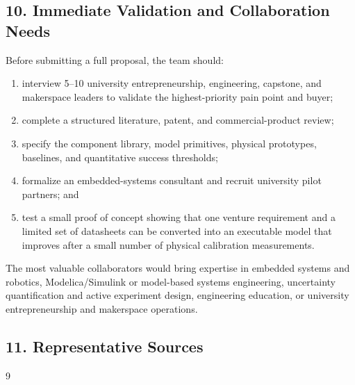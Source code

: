 \documentclass[12pt,letterpaper]{article}
\begin{document}
\subsection*{10. Immediate Validation and Collaboration Needs}

Before submitting a full proposal, the team should:

\begin{enumerate}
    \item interview 5--10 university entrepreneurship, engineering, capstone, and makerspace leaders to validate the highest-priority pain point and buyer;
    \item complete a structured literature, patent, and commercial-product review;
    \item specify the component library, model primitives, physical prototypes, baselines, and quantitative success thresholds;
    \item formalize an embedded-systems consultant and recruit university pilot partners; and
    \item test a small proof of concept showing that one venture requirement and a limited set of datasheets can be converted into an executable model that improves after a small number of physical calibration measurements.
\end{enumerate}

The most valuable collaborators would bring expertise in embedded systems and robotics, Modelica/Simulink or model-based systems engineering, uncertainty quantification and active experiment design, engineering education, or university entrepreneurship and makerspace operations.

\subsection*{11. Representative Sources}

\begin{thebibliography}{9}
\small






\end{thebibliography}
\end{document}

